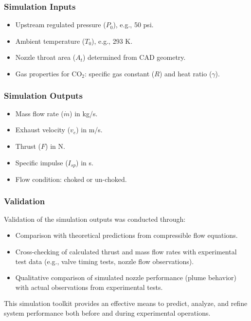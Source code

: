 \documentclass{new-aiaa}
\begin{document}
\subsubsection{Simulation Inputs}
\begin{itemize}
    \item Upstream regulated pressure ($P_0$), e.g., 50 psi.
    \item Ambient temperature ($T_0$), e.g., 293 K.
    \item Nozzle throat area ($A_t$) determined from CAD geometry.
    \item Gas properties for CO$_2$: specific gas constant ($R$) and heat ratio ($\gamma$).
\end{itemize}

\subsubsection{Simulation Outputs}
\begin{itemize}
    \item Mass flow rate ($\dot{m}$) in kg/s.
    \item Exhaust velocity ($v_e$) in m/s.
    \item Thrust ($F$) in N.
    \item Specific impulse ($I_{sp}$) in s.
    \item Flow condition: choked or un-choked.
\end{itemize}

\subsubsection{Validation}
Validation of the simulation outputs was conducted through:
\begin{itemize}
    \item Comparison with theoretical predictions from compressible flow equations.
    \item Cross-checking of calculated thrust and mass flow rates with experimental test data (e.g., valve timing tests, nozzle flow observations).
    \item Qualitative comparison of simulated nozzle performance (plume behavior) with actual observations from experimental tests.
\end{itemize}

This simulation toolkit provides an effective means to predict, analyze, and refine system performance both before and during experimental operations.
\end{document}
